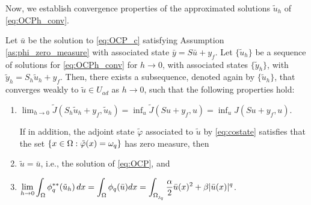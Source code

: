 %
Now, we establish convergence properties of the approximated solutions $\tilde u_h$ of 
\eqref{eq:OCPh_conv}. 
%
\begin{theorem}\label{t:convergence}
	Let $\bar u$ be the solution to \eqref{eq:OCP_c} satisfying Assumption \ref{as:phi_zero_measure} with associated state $\bar y= S\bar u +y_f$. Let $\{\tilde u_h\}$ be a sequence of solutions for \eqref{eq:OCPh_conv} for $h \to 0$, with associated states $\{\tilde y_h\}$, with $\tilde y_h= S_h\tilde u_h + y_f$. Then, %
there exists a subsequence, denoted again by $\{\tilde u_h\}$, that converges weakly to $\tilde u \in U_{ad}$ as $h \to 0$, such  that  the following properties hold:
\begin{enumerate}
	\item $\displaystyle\lim_{h \to 0} \tilde J(S_h \tilde u_h +y_f,\tilde u_h )= \inf_u \tilde J( S u + y_f,  u)= \inf_u J(Su+y_f,u)$.
	
\noindent If in addition, the adjoint state $\tilde\varphi$ associated to $\tilde u$ by \eqref{eq:costate} satisfies that the set $\{x\in\Omega: \tilde\varphi(x)=\omega_q\}$ has zero measure, then
	\item   $\tilde u = \bar u$, i.e., the solution of \eqref{eq:OCP}, and 
	\item  $\displaystyle \lim_{h\to 0} \int_\Omega \phi_q^{**}(\tilde u_h)\, dx =\int_\Omega \phi_q(\bar u) dx=\int_{\Omega_{\operatorname{\jmath}_q}} \frac{\alpha}{2} \bar u(x)^2 + \beta |\bar u(x)|^q   $.
\end{enumerate}

\end{theorem}	

